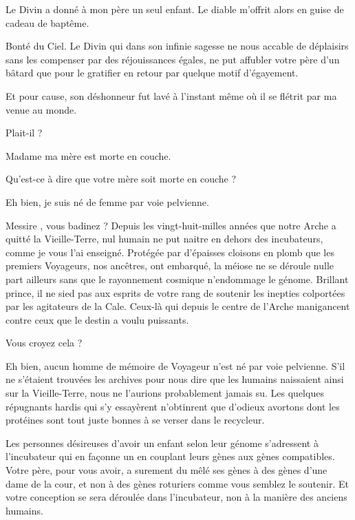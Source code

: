 \begin{drama}
  \elenaspeaks Le Divin a donné à mon père un seul enfant. Le diable m’offrit alors en guise de cadeau de baptême.

  \alexasspeaks Bonté du Ciel. Le Divin qui dans son infinie sagesse ne nous accable de déplaisirs sans les compenser par des réjouissances égales,  ne put affubler votre père d’un bâtard que pour le gratifier en retour par quelque motif d’égayement.

  \elenaspeaks Et pour cause, son déshonneur fut lavé à l’instant même où il se flétrit par ma venue au monde.

  \alexasspeaks Plait-il ?

  \elenaspeaks Madame ma mère est morte en couche.

  \alexasspeaks Qu’est-ce à dire que votre mère soit morte en couche ?

  \elenaspeaks Eh bien, je suis né de femme par voie pelvienne. 

  \alexasspeaks Messire \elena, vous badinez  ? %
                Depuis les vingt-huit-milles années que notre Arche a quitté la Vieille-Terre, nul humain ne put naitre en dehors des incubateurs, comme je vous l’ai enseigné. Protégée par d’épaisses cloisons en plomb que les premiers Voyageurs, nos ancêtres, ont embarqué, la méiose ne se déroule nulle part ailleurs sans que le rayonnement cosmique n’endommage le génome. Brillant prince, il ne sied pas aux esprits de votre rang de soutenir les inepties colportées par les agitateurs de la Cale. Ceux-là qui depuis le centre de l’Arche manigancent contre ceux que le destin a voulu puissants.


  \elenaspeaks Vous croyez cela ?


  \alexasspeaks Eh %
   bien, aucun homme de mémoire de Voyageur n’est né par voie pelvienne. S’il ne s’étaient trouvées les archives pour nous dire que les humains naissaient ainsi sur la Vieille-Terre, nous ne l’aurions probablement jamais su. Les quelques répugnants hardis qui s’y essayèrent n’obtinrent que d’odieux avortons dont les protéines sont tout juste bonnes à se verser dans le recycleur.

  Les personnes désireuses d’avoir un enfant selon leur génome s’adressent à l’incubateur qui en façonne un en couplant leurs gènes aux gènes compatibles. Votre père, pour vous avoir, a surement du mêlé ses gènes à des gènes d’une dame de la cour, et non à des gènes roturiers comme vous semblez le soutenir. Et votre conception se sera déroulée dans l’incubateur, non à la manière des anciens humains.


\end{drama}
